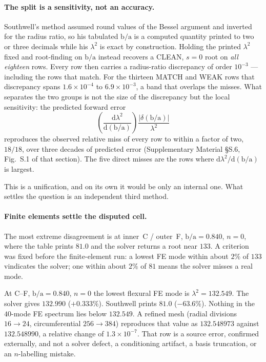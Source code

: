\documentclass[11pt]{article}
\newcommand{\lamsq}{\lambda^{2}}
\newcommand{\ba}{\mbox{b/a}}
\begin{document}
\paragraph{The split is a sensitivity, not an accuracy.}
Southwell's method assumed round values of the Bessel argument and inverted
for the radius ratio, so his tabulated $\ba$ is a computed quantity printed to
two or three decimals while his $\lamsq$ is exact by construction. Holding the
printed $\lamsq$ fixed and root-finding on $\ba$ instead recovers a CLEAN,
$s=0$ root on \emph{all eighteen} rows. Every row then carries a radius-ratio
discrepancy of order $10^{-3}$ --- including the rows that match. For the
thirteen MATCH and WEAK rows that discrepancy spans
$1.6\times10^{-4}$ to $6.9\times10^{-3}$, a band that overlaps the misses.
What separates the two groups is not the size of the discrepancy but the local
sensitivity: the predicted forward error
\begin{equation}
\left(\frac{\mathrm{d}\lamsq}{\mathrm{d}(\ba)}\right)
\frac{|\delta(\ba)|}{\lamsq}
\label{eq:pred}
\end{equation}
reproduces the observed relative miss of every row to within a factor of two,
$18/18$, over three decades of predicted error (Supplementary Material
\S{}S.6, Fig.~S.1 of that section). The five direct misses are the rows where
$\mathrm{d}\lamsq/\mathrm{d}(\ba)$ is largest.

This is a unification, and on its own it would be only an internal one. What
settles the question is an independent third method.

\paragraph{Finite elements settle the disputed cell.}
The most extreme disagreement is at inner~C / outer~F, $\ba=0.840$, $n=0$,
where the table prints $81.0$ and the solver returns a root near $133$. A
criterion was fixed before the finite-element run: a lowest FE mode within
about $2\%$ of $133$ vindicates the solver; one within about $2\%$ of $81$
means the solver misses a real mode.

At C--F, $\ba=0.840$, $n=0$ the lowest flexural FE mode is $\lamsq=132.549$.
The solver gives $132.990$ ($+0.333\%$). Southwell prints $81.0$ ($-63.6\%$).
Nothing in the $40$-mode FE spectrum lies below $132.549$. A refined mesh
(radial divisions $16\to24$, circumferential $256\to384$) reproduces that
value as $132.548973$ against $132.548990$, a relative change of
$1.3\times10^{-7}$. That row is a source error, confirmed externally, and not
a solver defect, a conditioning artifact, a basis truncation, or an
$n$-labelling mistake.
\end{document}

